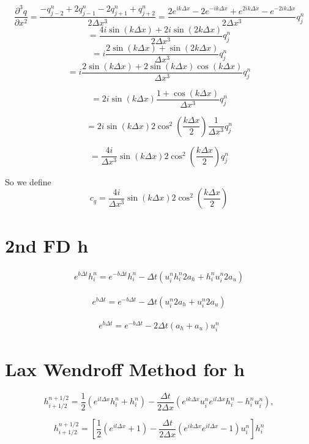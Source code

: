 \documentclass[12pt]{article}
\begin{document}
\[\frac{\partial^3 q}{\partial x^2} = \frac{-q^{n}_{j-2} +2q^{n}_{j-1} -2q^{n}_{j+1} +q^{n}_{j+2}}{2\Delta x^3} =\frac{2e^{ik\Delta x} - 2e^{-ik\Delta x} + e^{2ik\Delta x} - e^{-2ik\Delta x} }{2\Delta x^3} q^{n}_{j}  \]
\[=\frac{4i \sin\left(k\Delta x\right) + 2i\sin\left(2k\Delta x\right)}{2\Delta x^3} q^{n}_{j}\]
\[=i\frac{2 \sin\left(k\Delta x\right) + \sin\left(2k\Delta x\right)}{\Delta x^3} q^{n}_{j}\]
\[=i\frac{2 \sin\left(k\Delta x\right) + 2\sin\left(k\Delta x\right)\cos\left(k\Delta x\right)}{\Delta x^3} q^{n}_{j}\]

\[=2i\sin\left(k\Delta x\right)\frac{1 + \cos\left(k\Delta x\right)}{\Delta x^3} q^{n}_{j}\]

\[=2i\sin\left(k\Delta x\right) 2\cos^2\left(\frac{k\Delta x}{2}\right) \frac{1}{\Delta x^3} q^{n}_{j}\]

\[= \frac{4i}{\Delta x^3}\sin\left(k\Delta x\right) 2\cos^2\left(\frac{k\Delta x}{2}\right) q^{n}_{j}\]

So we define 
\[c_q = \frac{4i}{\Delta x^3}\sin\left(k\Delta x\right) 2\cos^2\left(\frac{k\Delta x}{2}\right) \]

\section{2nd FD h}
	\begin{gather}
	e^{b \Delta t}h^{n}_i = e^{-b \Delta t}h^{n}_i - \Delta t \left(u^{n}_{i}h^{n}_{i}2a_h  + h^{n}_{i}u^{n}_{i}2a_u\right) 
	\end{gather}
	
	\begin{gather}
	e^{b \Delta t} = e^{-b \Delta t} - \Delta t \left(u^{n}_{i}2a_h  + u^{n}_{i}2a_u\right) 
	\end{gather}
	
	\begin{gather}
	e^{b \Delta t} = e^{-b \Delta t} - 2\Delta t \left(a_h  + a_u\right) u^{n}_{i}
	\end{gather}
	
\section{Lax Wendroff Method for h}

\[
h^{n + 1/2}_{i+ 1/2} = \frac{1}{2}\left(e^{il\Delta x}h^{n}_{i} + h^{n}_i\right) - \frac{\Delta t}{2\Delta x}\left(e^{ik\Delta x}u^n_{i}e^{il\Delta x}h^n_{i} - h^n_{i}u^n_{i}\right),
\]

\[
h^{n + 1/2}_{i+ 1/2} = \left[\frac{1}{2}\left(e^{il\Delta x} + 1\right) - \frac{\Delta t}{2\Delta x}\left(e^{ik\Delta x}e^{il\Delta x} - 1\right)u^n_{i} \right] h^n_i
\]
\end{document}
